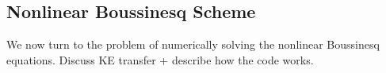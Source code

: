 
\subsection{Nonlinear Boussinesq Scheme}

We now turn to the problem of numerically solving the nonlinear Boussinesq equations. Discuss KE transfer + describe how the code works.
